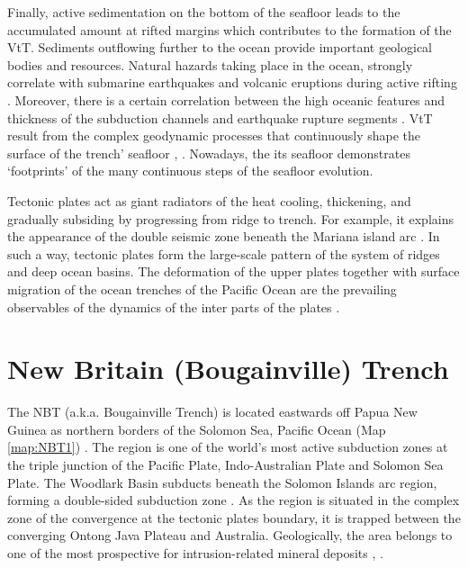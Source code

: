 \documentclass[11pt,a4paper]{report}
\begin{document}
Finally, active sedimentation on the bottom of the seafloor leads to the accumulated amount at rifted margins which contributes to the formation of the \ac{VtT}. Sediments outflowing further to the ocean provide important geological bodies and resources. Natural hazards taking place in the ocean, strongly correlate with submarine earthquakes and volcanic eruptions during active rifting \cite{Brune2016}. Moreover, there is a certain correlation between the high oceanic features and thickness of the subduction channels and earthquake rupture segments \cite{ContrerasReyesCarrizo2011}. \ac{VtT} result from the complex geodynamic processes that continuously shape the surface of the trench' seafloor \cite{BogolepovChikov1976}, \cite{Lemenkova202003}. Nowadays, the its seafloor demonstrates ‘footprints’ of the many continuous steps of the seafloor evolution. 

Tectonic plates act as giant radiators of the heat cooling, thickening, and gradually subsiding by progressing from ridge to trench. For example, it explains the appearance of the double seismic zone beneath the Mariana island arc \citep{SamowitzForsyth1981}. In such a way, tectonic plates form the large-scale pattern of the system of ridges and deep ocean basins. The deformation of the upper plates together with surface migration of the ocean trenches of the Pacific Ocean are the prevailing observables of the dynamics of the inter parts of the plates \citep{Milleretal2004}. 

\pagebreak
\section{New Britain (Bougainville) Trench}
The \ac{NBT} (a.k.a. Bougainville Trench) is located eastwards off Papua New Guinea as northern borders of the Solomon Sea, Pacific Ocean (Map \ref{map:NBT1}) \cite{Lemenkova202025}. The region is one of the world's most active subduction zones at the triple junction of the Pacific Plate, Indo-Australian Plate and Solomon Sea Plate. The Woodlark Basin subducts beneath the Solomon Islands arc region, forming a double-sided subduction zone \cite{Yoneshimaetal2005}. As the region is situated in the complex zone of the convergence at the tectonic plates boundary, it is trapped between the converging Ontong Java Plateau and Australia. Geologically, the area belongs to one of the most prospective for intrusion-related mineral deposits \cite{Holmetal2019}, \cite{Lemenkova202025}.
\end{document}
